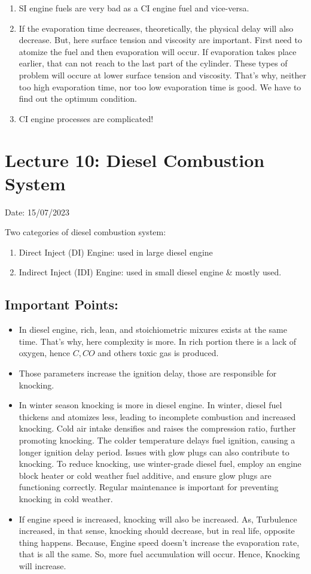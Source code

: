 \documentclass{article}
\begin{document}
\begin{enumerate}
  \item SI engine fuels are very bad as a CI engine fuel and vice-versa.
  \item If the evaporation time decreases, theoretically, the physical delay will also decrease. But, here surface tension and viscosity are important. First need to atomize the fuel and then evaporation will occur. If evaporation takes place earlier, that can not reach to the last part of the cylinder. These types of problem will occure at lower surface tension and viscosity. That's why, neither too high evaporation time, nor too low evaporation time is good. We have to find out the optimum condition. 
  \item CI engine processes are complicated!
\end{enumerate}


\section{Lecture 10: Diesel Combustion System} 
\hfill Date: 15/07/2023

Two categories of diesel combustion system:
\begin{enumerate}
  \item Direct Inject (DI) Engine: used in large diesel engine
  \item Indirect Inject (IDI) Engine: used in small diesel engine \& mostly used. 
\end{enumerate}

\subsection*{Important Points:}
\begin{itemize}
  \item In diesel engine, rich, lean, and stoichiometric mixures exists at the same time. That's why, here complexity is more. In rich portion there is a lack of oxygen, hence $C, CO$ and others toxic gas is produced. 
  \item Those parameters increase the ignition delay, those are responsible for knocking. 
  \item In winter season knocking is more in diesel engine. In winter, diesel fuel thickens and atomizes less, leading to incomplete combustion and increased knocking. Cold air intake densifies and raises the compression ratio, further promoting knocking. The colder temperature delays fuel ignition, causing a longer ignition delay period. Issues with glow plugs can also contribute to knocking. To reduce knocking, use winter-grade diesel fuel, employ an engine block heater or cold weather fuel additive, and ensure glow plugs are functioning correctly. Regular maintenance is important for preventing knocking in cold weather. 
  \item If engine speed is increased, knocking will also be increased. As, Turbulence increased, in that sense, knocking should decrease, but in real life, opposite thing happens.  Because, Engine speed doesn't increase the evaporation rate, that is all the same. So, more fuel accumulation will occur. Hence, Knocking will increase.   
\end{itemize}
\end{document}
